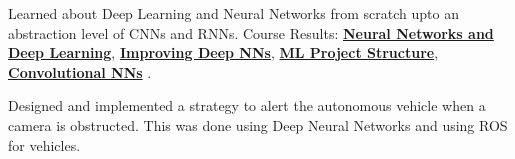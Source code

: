 \documentclass[theme]{cv_einstein}
\begin{document}
\begin{paracol}{2}
\begin{rightcolumn}
            {Learned about Deep Learning and Neural Networks from scratch upto an abstraction level of CNNs and RNNs.}
            {Course Results: \href{https://www.coursera.org/account/accomplishments/verify/JN2QE943XXQG}{\textbf{Neural Networks and Deep Learning}},  \href{https://www.coursera.org/account/accomplishments/verify/PN2EUS7KKZVS}{\textbf{Improving Deep NNs}}, \href{https://www.coursera.org/account/accomplishments/verify/UL9YMW7FWWF7}{\textbf{ML Project Structure}}, \href{https://www.coursera.org/account/accomplishments/verify/7YUGNR4CRE36}{\textbf{Convolutional NNs}} .}

            \vspace{\sectionspace}
            {Designed and implemented a strategy to alert the autonomous vehicle when a camera is obstructed. This was done using Deep Neural Networks and using ROS for vehicles.}

            \vspace{\sectionspace}
            \begin{minipage}[r]{\rightcolwidth}
                \\
                \vspace{4pt}\\
            \end{minipage}
        \end{rightcolumn}
        \vspace{20em}
    \end{paracol}
\end{document}
